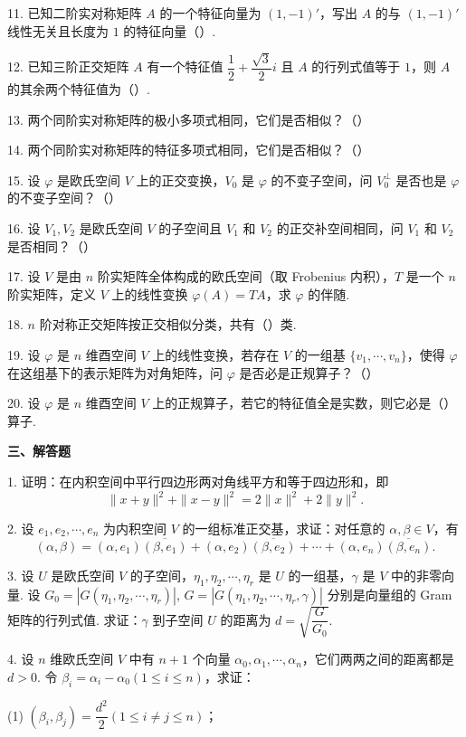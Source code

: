 \documentclass[UTF8,12pt,a4paper,fontset=fandol]{ctexart}
\begin{document}
11. 已知二阶实对称矩阵 $A$ 的一个特征向量为 $(1,-1)'$，写出 $A$ 的与 $(1,-1)'$ 线性无关且长度为 $1$ 的特征向量（\quad ）.

12. 已知三阶正交矩阵 $A$ 有一个特征值 $\dfrac{1}{2}+\dfrac{\sqrt{3}}{2}i$ 且 $A$ 的行列式值等于 $1$，则 $A$ 的其余两个特征值为（\quad ）.

13. 两个同阶实对称矩阵的极小多项式相同，它们是否相似？（\quad ）

14. 两个同阶实对称矩阵的特征多项式相同，它们是否相似？（\quad ）

15. 设 $\varphi$ 是欧氏空间 $V$ 上的正交变换，$V_0$ 是 $\varphi$ 的不变子空间，问 $V_0^\perp$ 是否也是 $\varphi$ 的不变子空间？（\quad ）

16. 设 $V_1,V_2$ 是欧氏空间 $V$ 的子空间且 $V_1$ 和 $V_2$ 的正交补空间相同，问 $V_1$ 和 $V_2$ 是否相同？（\quad ）

17. 设 $V$ 是由 $n$ 阶实矩阵全体构成的欧氏空间（取 Frobenius 内积），$T$ 是一个 $n$ 阶实矩阵，定义 $V$ 上的线性变换 $\varphi(A)=TA$，求 $\varphi$ 的伴随.

18. $n$ 阶对称正交矩阵按正交相似分类，共有（\quad ）类.

19. 设 $\varphi$ 是 $n$ 维酉空间 $V$ 上的线性变换，若存在 $V$ 的一组基 $\{v_1,\cdots,v_n\}$，使得 $\varphi$ 在这组基下的表示矩阵为对角矩阵，问 $\varphi$ 是否必是正规算子？（\quad ）

20. 设 $\varphi$ 是 $n$ 维酉空间 $V$ 上的正规算子，若它的特征值全是实数，则它必是（\quad ）算子.

\noindent\textbf{三、解答题}

1. 证明：在内积空间中平行四边形两对角线平方和等于四边形和，即
\[
\|x+y\|^2+\|x-y\|^2=2\|x\|^2+2\|y\|^2.
\]

2. 设 $e_1,e_2,\cdots,e_n$ 为内积空间 $V$ 的一组标准正交基，求证：对任意的 $\alpha,\beta\in V$，有
\[
(\alpha,\beta)=(\alpha,e_1)\overline{(\beta,e_1)}+(\alpha,e_2)\overline{(\beta,e_2)}+\cdots+(\alpha,e_n)\overline{(\beta,e_n)}.
\]

3. 设 $U$ 是欧氏空间 $V$ 的子空间，$\eta_1,\eta_2,\cdots,\eta_r$ 是 $U$ 的一组基，$\gamma$ 是 $V$ 中的非零向量. 设 $G_0=|G(\eta_1,\eta_2,\cdots,\eta_r)|$, $G=|G(\eta_1,\eta_2,\cdots,\eta_r,\gamma)|$ 分别是向量组的 Gram 矩阵的行列式值. 求证：$\gamma$ 到子空间 $U$ 的距离为 $d=\sqrt{\dfrac{G}{G_0}}$.

4. 设 $n$ 维欧氏空间 $V$ 中有 $n+1$ 个向量 $\alpha_0,\alpha_1,\cdots,\alpha_n$，它们两两之间的距离都是 $d>0$. 令 $\beta_i=\alpha_i-\alpha_0(1\le i\le n)$，求证：

(1) $(\beta_i,\beta_j)=\dfrac{d^2}{2}(1\le i\ne j\le n)$；
\end{document}
